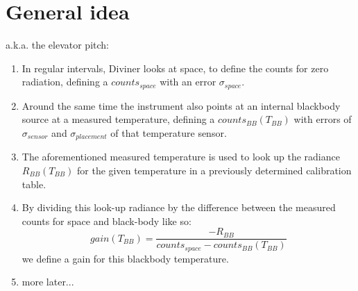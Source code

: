\section{General idea}
a.k.a. the elevator pitch:

\begin{enumerate}
\item In regular intervals, Diviner looks at space, to define the counts for zero radiation, defining a $counts_{space}$ with an error $\sigma_{space}$. 
\item Around the same time the instrument also points at an internal blackbody source at a measured temperature, defining a $counts_{BB}\left(T_{BB}\right)$ with errors of $\sigma_{sensor}$ and $\sigma_{placement}$ of that temperature sensor.
\item The aforementioned measured temperature is used to look up the radiance $R_{BB}\left(T_{BB}\right)$ for the given temperature in a previously determined calibration table.
\item By dividing this look-up radiance by the difference between the measured counts for space and black-body like so: $$ gain\left(T_{BB}\right) = \frac{-R_{BB}}{counts_{space} - counts_{BB}\left(T_{BB}\right)} $$ we define a gain for this blackbody temperature.
\item more later...
\end{enumerate}